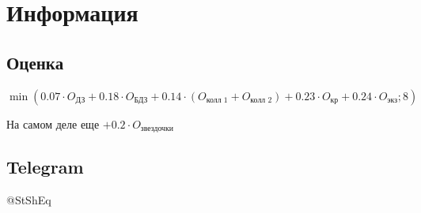 \section{Информация}

\subsection{Оценка}
\(
\min (0.07 \cdot O_{\text{ДЗ}} + 0.18 \cdot O_{\text{БДЗ}}
+ 0.14 \cdot (O_{\text{колл 1}} + O_{\text{колл 2}}) + 0.23 \cdot O_{\text{кр}} + 0.24 \cdot O_{\text{экз}}; 8)
\)

На самом деле еще \( + 0.2 \cdot O_{\text{звездочки}} \)

\subsection{Telegram}
@StShEq
